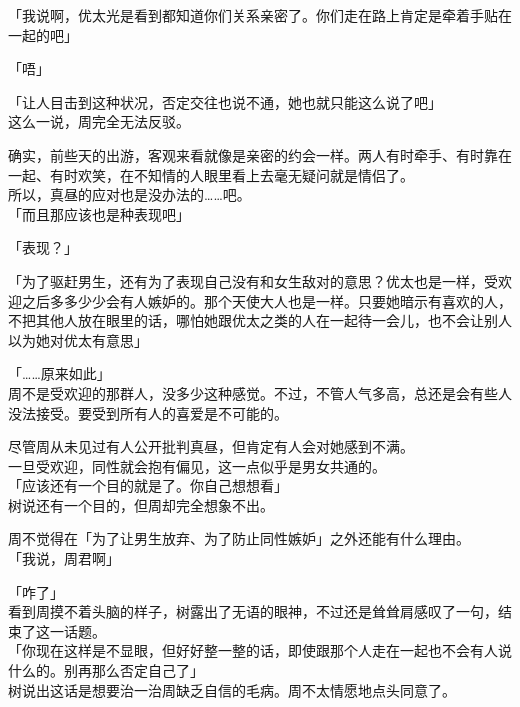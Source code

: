 「我说啊，优太光是看到都知道你们关系亲密了。你们走在路上肯定是牵着手贴在一起的吧」

「唔」

「让人目击到这种状况，否定交往也说不通，她也就只能这么说了吧」\\

这么一说，周完全无法反驳。

确实，前些天的出游，客观来看就像是亲密的约会一样。两人有时牵手、有时靠在一起、有时欢笑，在不知情的人眼里看上去毫无疑问就是情侣了。\\

所以，真昼的应对也是没办法的……吧。\\

「而且那应该也是种表现吧」

「表现？」

「为了驱赶男生，还有为了表现自己没有和女生敌对的意思？优太也是一样，受欢迎之后多多少少会有人嫉妒的。那个天使大人也是一样。只要她暗示有喜欢的人，不把其他人放在眼里的话，哪怕她跟优太之类的人在一起待一会儿，也不会让别人以为她对优太有意思」

「……原来如此」\\

周不是受欢迎的那群人，没多少这种感觉。不过，不管人气多高，总还是会有些人没法接受。要受到所有人的喜爱是不可能的。

尽管周从未见过有人公开批判真昼，但肯定有人会对她感到不满。\\

一旦受欢迎，同性就会抱有偏见，这一点似乎是男女共通的。\\

「应该还有一个目的就是了。你自己想想看」\\

树说还有一个目的，但周却完全想象不出。

周不觉得在「为了让男生放弃、为了防止同性嫉妒」之外还能有什么理由。\\

「我说，周君啊」

「咋了」\\

看到周摸不着头脑的样子，树露出了无语的眼神，不过还是耸耸肩感叹了一句，结束了这一话题。\\

「你现在这样是不显眼，但好好整一整的话，即使跟那个人走在一起也不会有人说什么的。别再那么否定自己了」\\

树说出这话是想要治一治周缺乏自信的毛病。周不太情愿地点头同意了。\\


